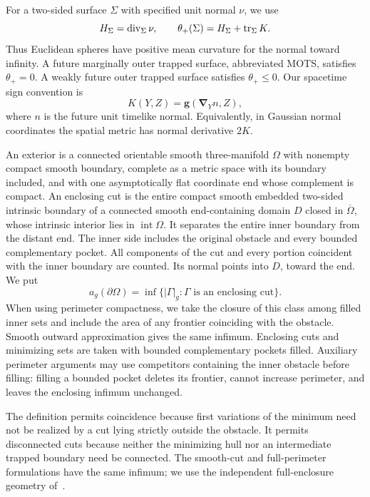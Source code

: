 For a two-sided surface \(\Sigma\) with specified unit normal \(\nu\),
we use
\[
 H_\Sigma=\operatorname{div}_\Sigma\nu,\qquad
 \theta_+(\Sigma)=H_\Sigma+\operatorname{tr}_\Sigma K.
\]
Thus Euclidean spheres have positive mean curvature for the normal
toward infinity. A future marginally outer trapped surface, abbreviated
MOTS, satisfies \(\theta_+=0\). A weakly future outer trapped surface
satisfies \(\theta_+\le0\). Our spacetime sign convention is
\begin{equation}\label{n3:intro:k-sign}
 K(Y,Z)=\mathbf g(\mathbf\nabla_Y n,Z),
\end{equation}
where \(n\) is the future unit timelike normal. Equivalently, in Gaussian
normal coordinates the spatial metric has normal derivative \(2K\).

\begin{definition}\label{n3:intro:exterior-class}
An exterior is a connected orientable smooth three-manifold \(\Omega\)
with nonempty compact smooth boundary, complete as a metric space with
its boundary included, and with one asymptotically flat coordinate end
whose complement is compact.
An enclosing cut is the entire compact smooth embedded two-sided
intrinsic boundary of a connected smooth end-containing domain $D$
closed in $\overline\Omega$, whose intrinsic interior lies in
$\operatorname{int}\Omega$. It separates the entire inner boundary
from the distant end. The inner side includes the original obstacle
and every bounded complementary pocket. All components of the cut
and every portion coincident with the inner boundary are counted.
Its normal points into $D$, toward the end. We put
\[
 a_g(\partial\Omega)=
  \inf\{|\Gamma|_g:\Gamma\text{ is an enclosing cut}\}.
\]
When using perimeter compactness, we take the closure of this class
among filled inner sets and include the area of any frontier coinciding
with the obstacle. Smooth outward approximation gives the same
infimum. Enclosing cuts and minimizing sets are taken with bounded
complementary pockets filled. Auxiliary perimeter arguments may use
competitors containing the inner obstacle before filling: filling a bounded
pocket deletes its frontier, cannot increase perimeter, and leaves the enclosing
infimum unchanged.
\end{definition}

The definition permits coincidence because first variations of the
minimum need not be realized by a cut lying strictly outside the
obstacle. It permits disconnected cuts because neither the minimizing
hull nor an intermediate trapped boundary need be connected. The smooth-cut and full-perimeter formulations have the same infimum;
we use the independent full-enclosure geometry of~\cite[Lemma~2.1]{RiemannianCompanion}.

